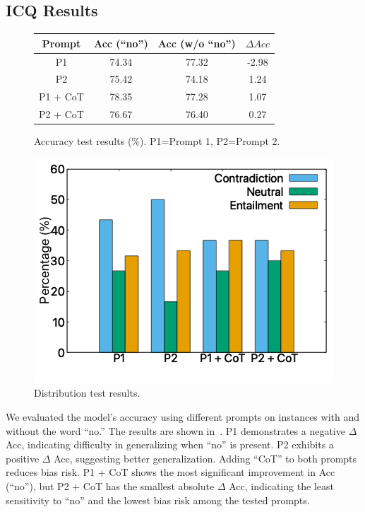 \subsection{ICQ Results}
\label{sec:chatgptacc}
\begin{figure}[th]
\centering
\begin{minipage}{0.45\linewidth}
\centering
\scriptsize
\begin{tabular}{c|ccc}
\toprule
\textbf{Prompt} & Acc (``no'') & Acc (w/o ``no'') & $\Delta Acc$ \\ \midrule
P1  & 74.34& 77.32& -2.98   \\ \hline
P2&  75.42& 74.18 & 1.24 \\ \hline
P1 + CoT  & 78.35& 77.28&1.07  \\ \hline
P2 + CoT&  76.67& 76.40&  0.27 \\ \hline
 \bottomrule
\end{tabular}
\caption{Accuracy test results (\%). P1=Prompt 1, P2=Prompt 2.}
\label{tab:accuracy}
\end{minipage}
\hfill
\begin{minipage}{0.4\linewidth}


\includegraphics[width=\columnwidth]{data/cue.png}
\caption{Distribution test results. }
\label{fig:cue_chatgpt}


\end{minipage}
\end{figure}


We evaluated the model's accuracy using different prompts on instances 
with and without the word ``no.'' The results are shown in~. 
P1 demonstrates a negative $\Delta$ Acc, 
indicating difficulty in generalizing when ``no'' is present. 
P2 exhibits a positive $\Delta$ Acc, suggesting better generalization. 
Adding ``CoT'' to both prompts reduces bias risk. 
P1 + CoT shows the most significant improvement in 
Acc (``no''), but P2 + CoT has the smallest absolute 
$\Delta$ Acc, indicating the least sensitivity to ``no'' 
and the lowest bias risk among the tested prompts.


